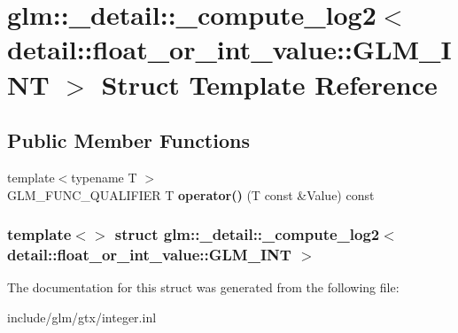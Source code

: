 \hypertarget{structglm_1_1__detail_1_1__compute__log2_3_01detail_1_1float__or__int__value_1_1GLM__INT_01_4}{\section{glm\-:\-:\-\_\-detail\-:\-:\-\_\-compute\-\_\-log2$<$ detail\-:\-:float\-\_\-or\-\_\-int\-\_\-value\-:\-:\-G\-L\-M\-\_\-\-I\-N\-T $>$ \-Struct \-Template \-Reference}
\label{structglm_1_1__detail_1_1__compute__log2_3_01detail_1_1float__or__int__value_1_1GLM__INT_01_4}
}
\subsection*{\-Public \-Member \-Functions}
\begin{DoxyCompactItemize}
\item 
\hypertarget{structglm_1_1__detail_1_1__compute__log2_3_01detail_1_1float__or__int__value_1_1GLM__INT_01_4_aa739d9d5f580facbbf7f4925bc62d97e}{{\footnotesize template$<$typename T $>$ }\\\-G\-L\-M\-\_\-\-F\-U\-N\-C\-\_\-\-Q\-U\-A\-L\-I\-F\-I\-E\-R \-T {\bfseries operator()} (\-T const \&\-Value) const }\label{structglm_1_1__detail_1_1__compute__log2_3_01detail_1_1float__or__int__value_1_1GLM__INT_01_4_aa739d9d5f580facbbf7f4925bc62d97e}

\end{DoxyCompactItemize}
\subsubsection*{template$<$$>$ struct glm\-::\-\_\-detail\-::\-\_\-compute\-\_\-log2$<$ detail\-::float\-\_\-or\-\_\-int\-\_\-value\-::\-G\-L\-M\-\_\-\-I\-N\-T $>$}



\-The documentation for this struct was generated from the following file\-:\begin{DoxyCompactItemize}
\item 
include/glm/gtx/integer.\-inl\end{DoxyCompactItemize}
